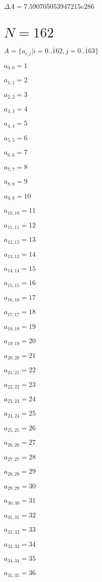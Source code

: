 \documentclass[a4paper,12pt]{article}
\begin{document}
$\Delta A = 7.590705053947215e286$



\section{ $N = 162$ }
$A = \{ a _{ i, j } | i = \overline { 0..162 }, j = \overline { 0..163 } \}$

$a _{ 0, 0 } = 1$

$a _{ 1, 1 } = 2$

$a _{ 2, 2 } = 3$

$a _{ 3, 3 } = 4$

$a _{ 4, 4 } = 5$

$a _{ 5, 5 } = 6$

$a _{ 6, 6 } = 7$

$a _{ 7, 7 } = 8$

$a _{ 8, 8 } = 9$

$a _{ 9, 9 } = 10$

$a _{ 10, 10 } = 11$

$a _{ 11, 11 } = 12$

$a _{ 12, 12 } = 13$

$a _{ 13, 13 } = 14$

$a _{ 14, 14 } = 15$

$a _{ 15, 15 } = 16$

$a _{ 16, 16 } = 17$

$a _{ 17, 17 } = 18$

$a _{ 18, 18 } = 19$

$a _{ 19, 19 } = 20$

$a _{ 20, 20 } = 21$

$a _{ 21, 21 } = 22$

$a _{ 22, 22 } = 23$

$a _{ 23, 23 } = 24$

$a _{ 24, 24 } = 25$

$a _{ 25, 25 } = 26$

$a _{ 26, 26 } = 27$

$a _{ 27, 27 } = 28$

$a _{ 28, 28 } = 29$

$a _{ 29, 29 } = 30$

$a _{ 30, 30 } = 31$

$a _{ 31, 31 } = 32$

$a _{ 32, 32 } = 33$

$a _{ 33, 33 } = 34$

$a _{ 34, 34 } = 35$

$a _{ 35, 35 } = 36$
\end{document}
